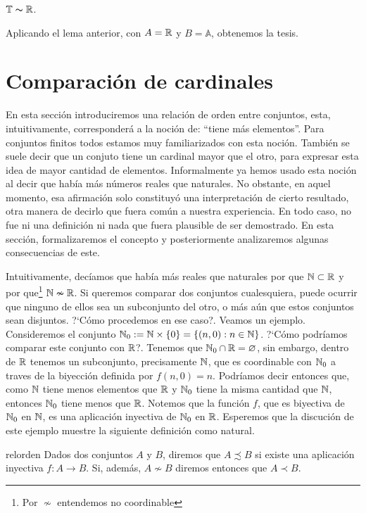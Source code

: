 \begin{corolario}{} $\mathbb{T}\thicksim\mathbb{R}$.
\end{corolario}
\begin{demo} Aplicando el lema anterior, con $A=\mathbb{R}$ y
$B=\mathbb{A}$, obtenemos la tesis.
\end{demo}

\section{Comparación de cardinales}
En esta sección introduciremos una relación de orden entre
conjuntos, esta, intuitivamente, corresponderá a la noción de:
``tiene más elementos''. Para conjuntos
finitos todos estamos muy familiarizados con esta noción. También se suele decir que un conjuto
tiene un cardinal mayor que el otro, para expresar esta idea de
mayor cantidad de elementos. Informalmente ya hemos usado esta
noción al decir que había más números reales que
naturales. No obstante, en aquel momento, esa afirmación solo
constituyó una interpretación de cierto resultado, otra manera
de decirlo que fuera común a nuestra experiencia. En todo caso,
no fue ni una definición ni nada que fuera
plausible de ser demostrado. En esta sección,  formalizaremos el
concepto   y posteriormente analizaremos
algunas consecuencias de este.

Intuitivamente, decíamos que había más reales que
naturales por que $\mathbb{N}\subset\mathbb{R}$ y por que\footnote{Por $\nsim$
entendemos no coordinable} $\mathbb{N}\nsim\mathbb{R}$. Si queremos comparar dos
conjuntos cualesquiera, puede ocurrir que ninguno de ellos sea un
subconjunto del otro, o más aún que estos conjuntos sean
disjuntos. ?`Cómo procedemos en ese caso?. Veamos un ejemplo.
Consideremos el conjunto $\mathbb{N}_0:=\mathbb{N}\times
\{0\}=\{(n,0):n\in\mathbb{N}\}$. ?`Cómo podríamos comparar este
conjunto con $\mathbb{R}$?. Tenemos que $\mathbb{N}_0\cap\mathbb{R}=\varnothing$, sin
embargo, dentro de $\mathbb{R}$ tenemos un subconjunto, precisamente
$\mathbb{N}$, que es coordinable con $\mathbb{N}_0$ a traves de la biyección
definida por $f(n,0)=n$. Podríamos decir entonces que, como
$\mathbb{N}$ tiene menos elementos que $\mathbb{R}$ y $\mathbb{N}_0$ tiene la misma
cantidad que $\mathbb{N}$, entonces $\mathbb{N}_0$ tiene menos que $\mathbb{R}$.
Notemos que la función $f$, que es biyectiva de $\mathbb{N}_0$ en
$\mathbb{N}$, es una aplicación inyectiva de $\mathbb{N}_0$ en $\mathbb{R}$.
Esperemos que la discución de este ejemplo muestre la
siguiente definición como natural.

\begin{definicion}{relorden} Dados dos conjuntos $A$ y $B$, diremos que
$A\precsim B$ si existe una aplicación inyectiva
$f:A\longrightarrow B$. Si, además, $A\nsim B$ diremos entonces
que $A\prec B$.
\end{definicion}


